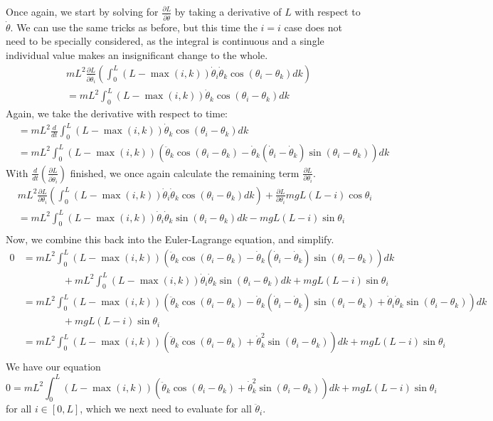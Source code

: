 \documentclass{article}
\begin{document}
Once again, we start by solving for $\frac{\partial L}{\partial \dot \theta}$ by taking a derivative of $L$ with respect to $\dot\theta$. We can use the same tricks as before, but this time the $i=i$ case does not need to be specially considered, as the integral is continuous and a single individual value makes an insignificant change to the whole.
\begin{align*}
&mL^2\frac{\partial L}{\partial \dot \theta_i}\left(\int_0^L(L-\max(i,k))\dot\theta_i\dot\theta_k\cos(\theta_i-\theta_k)dk\right)\\
&= mL^2\int_0^L(L-\max(i,k))\dot\theta_k\cos(\theta_i-\theta_k)dk
\end{align*}
Again, we take the derivative with respect to time:
\begin{align*}
&= mL^2\frac{d}{dt}\int_0^L(L-\max(i,k))\dot\theta_k\cos(\theta_i-\theta_k)dk\\
&= mL^2\int_0^L(L-\max(i,k))\left(\ddot\theta_k\cos(\theta_i-\theta_k)-\dot\theta_k(\dot\theta_i-\dot\theta_k)\sin(\theta_i-\theta_k)\right)dk
\end{align*}
With $\frac{d}{dt}\left(\frac{\partial L}{\partial \dot\theta_i}\right)$ finished, we once again calculate the remaining term $\frac{\partial L}{\partial \theta_i}$.
\begin{align*}
&mL^2\frac{\partial L}{\partial \theta_i}\left(\int_0^L(L-\max(i,k))\dot\theta_i\dot\theta_k\cos(\theta_i-\theta_k)dk\right) + \frac{\partial L}{\partial \theta_i}mgL(L-i)\cos\theta_i\\
&= mL^2\int_0^L(L-\max(i,k))\dot\theta_i\dot\theta_k\sin(\theta_i-\theta_k)dk - mgL(L-i)\sin\theta_i\\
\end{align*}
Now, we combine this back into the Euler-Lagrange equation, and simplify.
\begin{align*}
0&=mL^2\int_0^L(L-\max(i,k))\left(\ddot\theta_k\cos(\theta_i-\theta_k)-\dot\theta_k(\dot\theta_i-\dot\theta_k)\sin(\theta_i-\theta_k)\right)dk\\
&\qquad\qquad+ mL^2\int_0^L(L-\max(i,k))\dot\theta_i\dot\theta_k\sin(\theta_i-\theta_k)dk + mgL(L-i)\sin\theta_i\\
&=mL^2\int_0^L(L-\max(i,k))\left(\ddot\theta_k\cos(\theta_i-\theta_k)-\dot\theta_k(\dot\theta_i-\dot\theta_k)\sin(\theta_i-\theta_k) + \dot\theta_i\dot\theta_k\sin(\theta_i-\theta_k)\right)dk\\
&\qquad\qquad+ mgL(L-i)\sin\theta_i\\
&=mL^2\int_0^L(L-\max(i,k))\left(\ddot\theta_k\cos(\theta_i-\theta_k)+\dot\theta_k^2\sin(\theta_i-\theta_k)\right)dk+ mgL(L-i)\sin\theta_i\\
\end{align*}
We have our equation 
$$0=mL^2\int_0^L(L-\max(i,k))\left(\ddot\theta_k\cos(\theta_i-\theta_k)+\dot\theta_k^2\sin(\theta_i-\theta_k)\right)dk+ mgL(L-i)\sin\theta_i$$
for all $i \in [0,L]$, which we next need to evaluate for all $\ddot\theta_i$.
\end{document}
